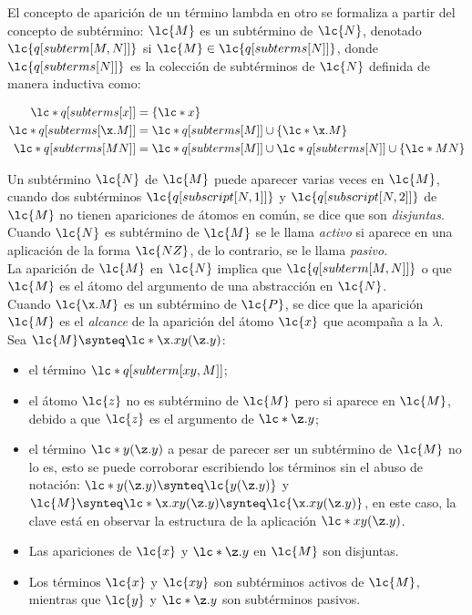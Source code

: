 El concepto de aparición de un término lambda en otro se formaliza a partir del
concepto de subtérmino: \(\lc{M}\) es un subtérmino de \(\lc{N}\), denotado
\(\lc{q[subterm[M,N]]}\) si \(\lc{M} \in \lc{q[subterms[N]]}\), donde
\(\lc{q[subterms[N]]}\) es la colección de subtérminos de \(\lc{N}\) definida de
manera inductiva como:

\begin{align*}
  \lc*{q[subterms[x]]} &= \{\lc*{x}\} \\
  \lc*{q[subterms[\x.M]]} &= \lc*{q[subterms[M]]} \cup \{\lc*{\x.M}\} \\
  \lc*{q[subterms[M N]]} &= \lc*{q[subterms[M]]} \cup \lc*{q[subterms[N]]} \cup \{\lc*{M N}\}
\end{align*}

Un subtérmino \(\lc{N}\) de \(\lc{M}\) puede aparecer varias veces en
\(\lc{M}\), cuando dos subtérminos \(\lc{q[subscript[N,1]]}\) y
\(\lc{q[subscript[N,2]]}\) de \(\lc{M}\) no tienen apariciones de átomos en
común, se dice que son \emph{disjuntas}. Cuando \(\lc{N}\) es subtérmino de
\(\lc{M}\) se le llama \emph{activo} si aparece en una aplicación de la forma
\(\lc{N Z}\), de lo contrario, se le llama \emph{pasivo}. \\

La aparición de \(\lc{M}\) en \(\lc{N}\) implica que \(\lc{q[subterm[M,N]]}\) o
que \(\lc{M}\) es el átomo del argumento de una abstracción en \(\lc{N}\). \\

Cuando \(\lc{\x.M}\) es un subtérmino de \(\lc{P}\), se dice que la aparición
\(\lc{M}\) es el \emph{alcance} de la aparición del átomo \(\lc{x}\) que
acompaña a la \(\lambda\). \\

Sea \(\lc{M}\synteq \lc*{\x.x y(\z.y)}\):

\begin{itemize}
\item el término \(\lc*{q[subterm[x y, M]]}\);
\item el átomo \(\lc{z}\) no es subtérmino de \(\lc{M}\) pero si aparece en
  \(\lc{M}\), debido a que \(\lc{z}\) es el argumento de \(\lc*{\z.y}\);
\item el término \(\lc*{y(\z.y)}\) a pesar de parecer ser un subtérmino de
  \(\lc{M}\) no lo es, esto se puede corroborar escribiendo los términos sin el
  abuso de notación: \(\lc*{y(\z.y)} \synteq \lc{y(\z.y)}\) y \(\lc{M} \synteq
  \lc*{\x.x y(\z.y)} \synteq \lc{\x.x y(\z.y)}\), en este caso, la clave está en
  observar la estructura de la aplicación \(\lc*{x y(\z.y)}\).
\item Las apariciones de \(\lc{x}\) y \(\lc*{\z.y}\) en \(\lc{M}\) son
  disjuntas.
\item Los términos \(\lc{x}\) y \(\lc{x y}\) son subtérminos activos de
  \(\lc{M}\), mientras que \(\lc{y}\) y \(\lc*{\z.y}\) son subtérminos pasivos.
\end{itemize}


